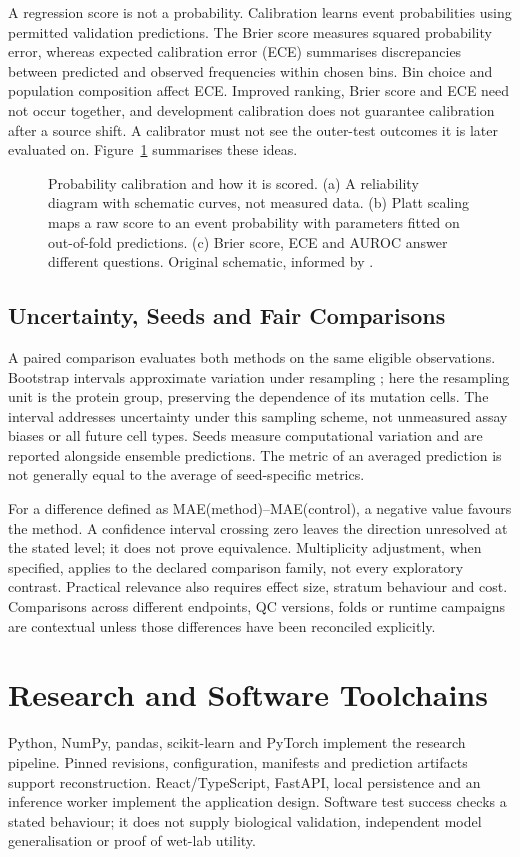 A regression score is not a probability. Calibration learns event probabilities using permitted
validation predictions. The Brier score measures squared probability error, whereas expected
calibration error (ECE) summarises discrepancies between predicted and observed frequencies within
chosen bins. Bin choice and population composition affect ECE. Improved ranking, Brier score and ECE
need not occur together, and development calibration does not guarantee calibration after a source
shift. A calibrator must not see the outer-test outcomes it is later evaluated on.
Figure~\ref{fig:calibration-concept} summarises these ideas.

\begin{figure}[htbp]
  \centering
  
  \caption[Probability calibration and how it is scored]{Probability calibration and how it is scored. (a) A reliability diagram with schematic curves, not measured data. (b) Platt scaling maps a raw score to an event probability with parameters fitted on out-of-fold predictions. (c) Brier score, ECE and AUROC answer different questions. Original schematic, informed by \citep{platt1999}.}
  \label{fig:calibration-concept}
\end{figure}



\subsection{Uncertainty, Seeds and Fair Comparisons}
A paired comparison evaluates both methods on the same eligible observations. Bootstrap intervals
approximate variation under resampling \citep{efron1979}; here the resampling unit is the protein
group, preserving the dependence of its mutation cells. The interval addresses uncertainty under this
sampling scheme, not unmeasured assay biases or all future cell types. Seeds measure computational
variation and are reported alongside ensemble predictions. The metric of an averaged prediction is
not generally equal to the average of seed-specific metrics.

For a difference defined as MAE(method)--MAE(control), a negative value favours the method. A
confidence interval crossing zero leaves the direction unresolved at the stated level; it does not
prove equivalence. Multiplicity adjustment, when specified, applies to the declared comparison family,
not every exploratory contrast. Practical relevance also requires effect size, stratum behaviour and
cost. Comparisons across different endpoints, QC versions, folds or runtime campaigns are contextual
unless those differences have been reconciled explicitly.

\section{Research and Software Toolchains}
Python, NumPy, pandas, scikit-learn and PyTorch implement the research pipeline. Pinned revisions,
configuration, manifests and prediction artifacts support reconstruction. React/TypeScript, FastAPI,
local persistence and an inference worker implement the application design. Software test success
checks a stated behaviour; it does not supply biological validation, independent model generalisation
or proof of wet-lab utility.
